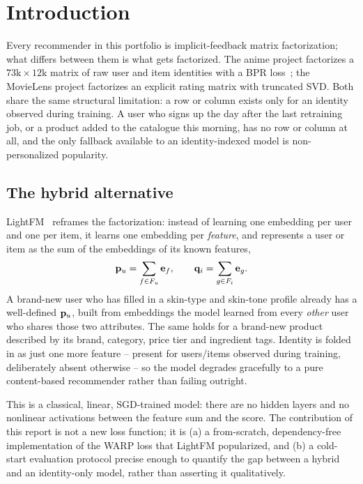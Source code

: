 \section{Introduction}
\label{sec:introduction}

Every recommender in this portfolio is implicit-feedback matrix
factorization; what differs between them is what gets factorized. The anime
project factorizes a $73\text{k} \times 12\text{k}$ matrix of raw user and
item identities with a BPR loss~\cite{rendle2009bpr}; the MovieLens project
factorizes an explicit rating matrix with truncated SVD. Both share the same
structural limitation: a row or column exists only for an identity observed
during training. A user who signs up the day after the last retraining job,
or a product added to the catalogue this morning, has no row or column at
all, and the only fallback available to an identity-indexed model is
non-personalized popularity.

\subsection{The hybrid alternative}

LightFM~\cite{kula2015} reframes the factorization: instead of learning one
embedding per user and one per item, it learns one embedding per
\emph{feature}, and represents a user or item as the sum of the embeddings
of its known features,
\begin{equation}
  \mathbf{p}_u = \sum_{f \in F_u} \mathbf{e}_f, \qquad
  \mathbf{q}_i = \sum_{g \in F_i} \mathbf{e}_g .
  \label{eq:feature-sum}
\end{equation}
A brand-new user who has filled in a skin-type and skin-tone profile already
has a well-defined $\mathbf{p}_u$, built from embeddings the model learned from
every \emph{other} user who shares those two attributes. The same holds for a
brand-new product described by its brand, category, price tier and
ingredient tags. Identity is folded in as just one more feature -- present
for users/items observed during training, deliberately absent otherwise --
so the model degrades gracefully to a pure content-based recommender rather
than failing outright.

This is a classical, linear, SGD-trained model: there are no hidden layers
and no nonlinear activations between the feature sum and the score. The
contribution of this report is not a new loss function; it is (a) a
from-scratch, dependency-free implementation of the WARP loss that LightFM
popularized, and (b) a cold-start evaluation protocol precise enough to
quantify the gap between a hybrid and an identity-only model, rather than
asserting it qualitatively.

